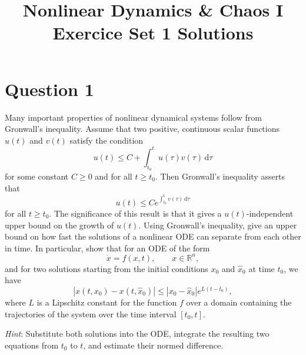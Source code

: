 \documentclass[twoside,10pt,a4paper]{article}
\title{\huge \textbf{Nonlinear Dynamics \& Chaos I \\ \Large Exercice Set 1 Solutions}}	%
\author{ }		%
\date{ }	%
\begin{document}
\maketitle

\section*{Question 1}
Many important properties of nonlinear dynamical systems follow from Gronwall's inequality. Assume that two positive, continuous scalar functions $u(t)$ and $v(t)$ satisfy the condition
\begin{equation*}
	u(t) \leq C + \int_{t_0}^t u(\tau)v(\tau) \, \text{d}\tau
\end{equation*}
for some constant $C \geq 0$ and for all $t \geq t_0$. Then Gronwall's inequality asserts that
\begin{equation*}
u(t) \leq Ce^{\int_{t_0}^t v(\tau) \, \text{d}\tau} 
\end{equation*}
for all $t \geq t_0$. The significance of this result is that it gives a $u(t)$-independent upper bound on the growth of $u(t)$. Using Gronwall's inequality, give an upper bound on how fast the solutions of a nonlinear ODE can separate from each other in time. In particular, show that for an ODE of the form
\begin{equation*}
	\dot{x} = f(x,t), \qquad x \in \mathbb{R}^n,
\end{equation*}
and for two solutions starting from the initial conditions $x_0$ and $\hat{x}_0$ at time $t_0$, we have
\begin{equation*}
	|x(t, x_0) - x(t, \hat{x}_0)| \leq |x_0 - \hat{x}_0|e^{L(t - t_0)},
\end{equation*}
where $L$ is a Lipschitz constant for the function $f$ over a domain containing the trajectories of the system over the time interval $[t_0, t]$.

\textit{Hint}: Substitute both solutions into the ODE, integrate the resulting two equations from $t_0$ to $t$, and estimate their normed difference.
\end{document}
